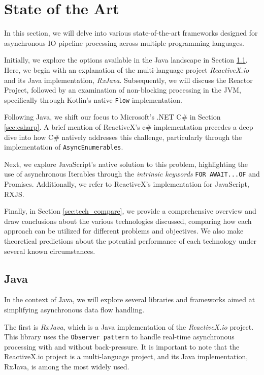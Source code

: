 	
\section{State of the Art} %
\label{sec:state_of_the_art}

In this section, we will delve into various state-of-the-art frameworks designed for asynchronous IO pipeline processing across multiple programming languages.

Initially, we explore the options available in the Java landscape in Section \ref{sec:java}. Here, we begin with an explanation of the multi-language project \textit{ReactiveX.io} and its Java implementation, \textit{RxJava}. Subsequently, we will discuss the Reactor Project, followed by an examination of non-blocking processing in the JVM, specifically through Kotlin's native \texttt{Flow} implementation.

Following Java, we shift our focus to Microsoft's .NET C\# in Section \ref{sec:csharp}. A brief mention of ReactiveX's c\# implementation precedes a deep dive into how C\# natively addresses this challenge, particularly through the implementation of \texttt{AsyncEnumerables}.

Next, we explore JavaScript's native solution to this problem, highlighting the use of asynchronous Iterables through the \textit{intrinsic keywords} \texttt{FOR AWAIT...OF} and Promises. Additionally, we refer to ReactiveX's implementation for JavaScript, RXJS.

Finally, in Section \ref{sec:tech_compare}, we provide a comprehensive overview and draw conclusions about the various technologies discussed, comparing how each approach can be utilized for different problems and objectives. We also make theoretical predictions about the potential performance of each technology under several known circumstances.

\subsection{Java}
\label{sec:java}

In the context of Java, we will explore several libraries and frameworks aimed at simplifying asynchronous data flow handling. 

The first is \textit{RxJava}, which is a Java implementation of the \textit{ReactiveX.io} project. This library uses the \texttt{Observer pattern} to handle real-time asynchronous processing with and without back-pressure. It is important to note that the ReactiveX.io project is a multi-language project, and its Java implementation, RxJava, is among the most widely used.

